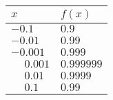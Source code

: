 \begin{tabular}{ll}
 $x$ & $f(x)$ \\ \midrule
 $-0.1$ & $0.9$ \\
 $-0.01$ & $0.99$ \\
 $-0.001$ & $0.999$ \\
 $\phantom{-}0.001$ & $0.999999$ \\
 $\phantom{-}0.01$ & $0.9999$ \\
 $\phantom{-}0.1$ & $0.99$
\end{tabular}
